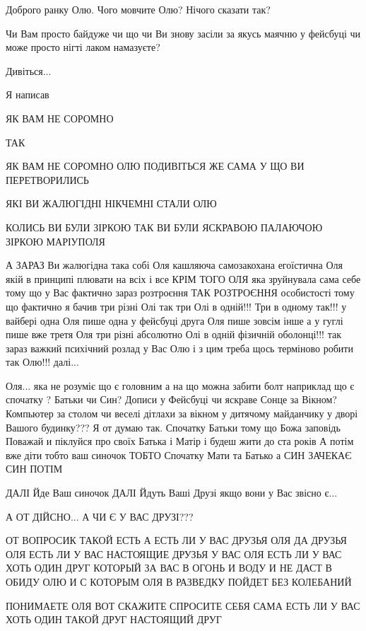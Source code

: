 Доброго ранку Олю. Чого мовчите Олю? Нічого сказати так?

Чи Вам просто байдуже чи що чи Ви знову засіли за якусь маячню у фейсбуці 
чи може просто нігті лаком намазуєте? 

Дивіться...

Я написав

ЯК ВАМ НЕ СОРОМНО

ТАК

ЯК ВАМ НЕ СОРОМНО ОЛЮ ПОДИВІТЬСЯ ЖЕ САМА У ЩО ВИ ПЕРЕТВОРИЛИСЬ

ЯКІ ВИ ЖАЛЮГІДНІ НІКЧЕМНІ СТАЛИ ОЛЮ

КОЛИСЬ ВИ БУЛИ ЗІРКОЮ ТАК ВИ БУЛИ ЯСКРАВОЮ ПАЛАЮЧОЮ ЗІРКОЮ МАРІУПОЛЯ

А ЗАРАЗ
  Ви 
	  жалюгідна така собі Оля кашляюча самозакохана егоїстична Оля 
		   якій в принципі плювати на всіх і все
КРІМ ТОГО
  ОЛЯ яка зруйнувала сама себе 
	  тому що у Вас фактично зараз розтроєння ТАК РОЗТРОЄННЯ особистості
		   тому що фактично я бачив три різні Олі 
			    так три Олі в одній!!! Три в одному так!!!
					   у вайбері одна Оля пише одна
						   у фейсбуці друга Оля пише зовсім інше
							   а у гуглі пише вже третя Оля
								   три різні абсолютно Олі в одній фізичній оболонці!!!
					так зараз важкий психічний розлад у Вас Олю і з цим треба щось 
					  терміново робити так Олю!!!
	  далі...

    Оля...
	  яка не розуміє що є головним а на що можна забити болт
		  наприклад 
			  що є спочатку ? Батьки чи Син? Дописи у Фейсбуці чи яскраве Сонце за Вікном?
				   Компьютер за столом чи веселі дітлахи за вікном у дитячому майданчику 
					   у дворі Вашого будинку???
Я от думаю так.
  Спочатку Батьки тому що Божа заповідь
	   Поважай и піклуйся про своїх Батька і Матір і будеш жити до ста років
		   А потім вже діти тобто ваш синочок
			   ТОБТО
				   Спочатку Мати та Батько а СИН ЗАЧЕКАЄ СИН ПОТІМ

	ДАЛІ
	  Йде Ваш синочок
	ДАЛІ
	  Йдуть Ваші Друзі якщо вони у Вас звісно є...

А ОТ ДІЙСНО...
  А ЧИ Є У ВАС ДРУЗІ???

ОТ ВОПРОСИК ТАКОЙ ЕСТЬ А ЕСТЬ ЛИ У ВАС ДРУЗЬЯ ОЛЯ
  ДА ДРУЗЬЯ ОЛЯ 
	  ЕСТЬ ЛИ У ВАС НАСТОЯЩИЕ ДРУЗЬЯ
		  У ВАС ОЛЯ ЕСТЬ ЛИ У ВАС ХОТЬ ОДИН ДРУГ
			   КОТОРЫЙ ЗА ВАС В ОГОНЬ И ВОДУ 
				   И НЕ ДАСТ В ОБИДУ ОЛЮ
             И С КОТОРЫМ ОЛЯ В РАЗВЕДКУ ПОЙДЕТ БЕЗ КОЛЕБАНИЙ

ПОНИМАЕТЕ ОЛЯ ВОТ СКАЖИТЕ СПРОСИТЕ СЕБЯ САМА
  ЕСТЬ ЛИ У ВАС ХОТЬ ОДИН ТАКОЙ ДРУГ 
	  НАСТОЯЩИЙ ДРУГ

